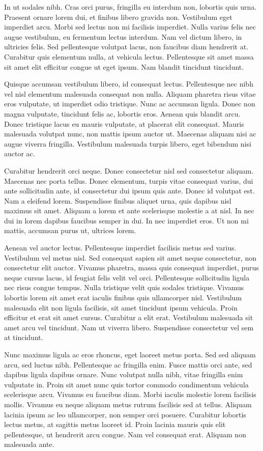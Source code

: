 \documentclass[landscape]{book}
\begin{document}
In ut sodales nibh. Cras orci purus, fringilla eu interdum non, lobortis quis urna. Praesent ornare lorem dui, et finibus libero gravida non. Vestibulum eget imperdiet arcu. Morbi sed lectus non mi facilisis imperdiet. Nulla varius felis nec augue vestibulum, eu fermentum lectus interdum. Nam vel dictum libero, in ultricies felis. Sed pellentesque volutpat lacus, non faucibus diam hendrerit at. Curabitur quis elementum nulla, at vehicula lectus. Pellentesque sit amet massa sit amet elit efficitur congue ut eget ipsum. Nam blandit tincidunt tincidunt.

Quisque accumsan vestibulum libero, id consequat lectus. Pellentesque nec nibh vel nisl elementum malesuada consequat non nulla. Aliquam pharetra risus vitae eros vulputate, ut imperdiet odio tristique. Nunc ac accumsan ligula. Donec non magna vulputate, tincidunt felis ac, lobortis eros. Aenean quis blandit arcu. Donec tristique lacus eu mauris vulputate, at placerat elit consequat. Mauris malesuada volutpat nunc, non mattis ipsum auctor ut. Maecenas aliquam nisi ac augue viverra fringilla. Vestibulum malesuada turpis libero, eget bibendum nisi auctor ac.

Curabitur hendrerit orci neque. Donec consectetur nisl sed consectetur aliquam. Maecenas nec porta tellus. Donec elementum, turpis vitae consequat varius, dui ante sollicitudin ante, id consectetur dui ipsum quis ante. Donec id volutpat est. Nam a eleifend lorem. Suspendisse finibus aliquet urna, quis dapibus nisl maximus sit amet. Aliquam a lorem et ante scelerisque molestie a at nisl. In nec dui in lorem dapibus faucibus semper in dui. In nec imperdiet eros. Ut non mi mattis, accumsan purus ut, ultrices lorem.

Aenean vel auctor lectus. Pellentesque imperdiet facilisis metus sed varius. Vestibulum vel metus nisl. Sed consequat sapien sit amet neque consectetur, non consectetur elit auctor. Vivamus pharetra, massa quis consequat imperdiet, purus neque cursus lacus, id feugiat felis velit vel orci. Pellentesque sollicitudin ligula nec risus congue tempus. Nulla tristique velit quis sodales tristique. Vivamus lobortis lorem sit amet erat iaculis finibus quis ullamcorper nisl. Vestibulum malesuada elit non ligula facilisis, sit amet tincidunt ipsum vehicula. Proin efficitur et erat sit amet cursus. Curabitur a elit erat. Vestibulum malesuada sit amet arcu vel tincidunt. Nam ut viverra libero. Suspendisse consectetur vel sem at tincidunt.

Nunc maximus ligula ac eros rhoncus, eget laoreet metus porta. Sed sed aliquam arcu, sed luctus nibh. Pellentesque ac fringilla enim. Fusce mattis orci ante, sed dapibus ligula dapibus ornare. Nunc volutpat nulla nibh, vitae fringilla enim vulputate in. Proin sit amet nunc quis tortor commodo condimentum vehicula scelerisque arcu. Vivamus eu faucibus diam. Morbi iaculis molestie lorem facilisis mollis. Vivamus eu neque aliquam metus rutrum facilisis sed at tellus. Aliquam lacinia ipsum ac leo ullamcorper, non semper orci posuere. Curabitur lobortis lectus metus, at sagittis metus laoreet id. Proin lacinia mauris quis elit pellentesque, ut hendrerit arcu congue. Nam vel consequat erat. Aliquam non malesuada ante.
\end{document}
